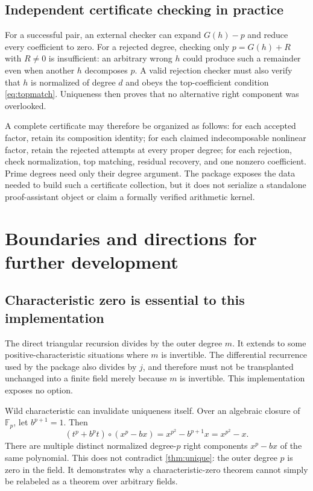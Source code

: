 \documentclass[11pt,a4paper]{article}
\theoremstyle{definition}
\newcommand{\code}[1]{\texttt{\detokenize{#1}}}
\begin{document}
\subsection{Independent certificate checking in practice}
For a successful pair, an external checker can expand $G(h)-p$ and reduce every coefficient to zero. For a rejected degree, checking only $p=G(h)+R$ with $R\ne0$ is insufficient: an arbitrary wrong $h$ could produce such a remainder even when another $h$ decomposes $p$. A valid rejection checker must also verify that $h$ is normalized of degree $d$ and obeys the top-coefficient condition \eqref{eq:topmatch}. Uniqueness then proves that no alternative right component was overlooked.

A complete certificate may therefore be organized as follows: for each accepted factor, retain its composition identity; for each claimed indecomposable nonlinear factor, retain the rejected attempts at every proper degree; for each rejection, check normalization, top matching, residual recovery, and one nonzero coefficient. Prime degrees need only their degree argument. The package exposes the data needed to build such a certificate collection, but it does not serialize a standalone proof-assistant object or claim a formally verified arithmetic kernel.

\section{Boundaries and directions for further development}
\subsection{Characteristic zero is essential to this implementation}
The direct triangular recursion divides by the outer degree $m$. It extends to some positive-characteristic situations where $m$ is invertible. The differential recurrence used by the package also divides by $j$, and therefore must not be transplanted unchanged into a finite field merely because $m$ is invertible. This implementation exposes no \code{Modulus} option.

Wild characteristic can invalidate uniqueness itself. Over an algebraic closure of $\mathbb F_p$, let $b^{p+1}=1$. Then
\[
 (t^p+b^pt)\circ(x^p-bx)
 =x^{p^2}-b^{p+1}x=x^{p^2}-x.
\]
There are multiple distinct normalized degree-$p$ right components $x^p-bx$ of the same polynomial. This does not contradict \cref{thm:unique}: the outer degree $p$ is zero in the field. It demonstrates why a characteristic-zero theorem cannot simply be relabeled as a theorem over arbitrary fields.
\end{document}
